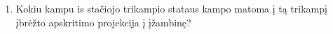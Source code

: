 \begin{enumerate}
\item Kokiu kampu is stačiojo trikampio stataus kampo matoma
  į tą trikampį įbrėžto apskritimo projekcija į įžambinę?

\end{enumerate}
